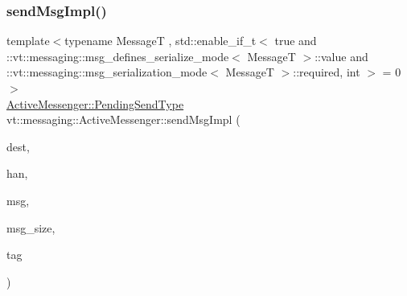 \subsubsection{\texorpdfstring{send\+Msg\+Impl()}{sendMsgImpl()}\hspace{0.1cm}{\footnotesize\ttfamily [2/4]}}
{\footnotesize\ttfamily template$<$typename MessageT , std\+::enable\+\_\+if\+\_\+t$<$ true and \+::vt\+::messaging\+::msg\+\_\+defines\+\_\+serialize\+\_\+mode$<$ Message\+T $>$\+::value and \+::vt\+::messaging\+::msg\+\_\+serialization\+\_\+mode$<$ Message\+T $>$\+::required, int $>$  = 0$>$ \\
\hyperlink{structvt_1_1messaging_1_1_active_messenger_a3626a6ca76d8ad4ec7c3b47a2c70d3a8}{Active\+Messenger\+::\+Pending\+Send\+Type} vt\+::messaging\+::\+Active\+Messenger\+::send\+Msg\+Impl (\begin{DoxyParamCaption}\item[{\hyperlink{namespacevt_a866da9d0efc19c0a1ce79e9e492f47e2}{Node\+Type}}]{dest,  }\item[{\hyperlink{namespacevt_af64846b57dfcaf104da3ef6967917573}{Handler\+Type}}]{han,  }\item[{\hyperlink{structvt_1_1messaging_1_1_msg_shared_ptr}{Msg\+Shared\+Ptr}$<$ MessageT $>$ \&}]{msg,  }\item[{\hyperlink{namespacevt_aab8d55968084610ce3b17057981e9300}{Byte\+Type}}]{msg\+\_\+size,  }\item[{\hyperlink{namespacevt_a84ab281dae04a52a4b243d6bf62d0e52}{Tag\+Type}}]{tag }\end{DoxyParamCaption})\hspace{0.3cm}{\ttfamily [inline]}}

\mbox{\label{structvt_1_1messaging_1_1_active_messenger_a7f2e8867a9d967eb7f43df7d5c420775}} 
